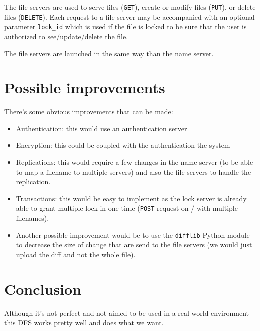 \documentclass[12pt,a4paper]{report}
\begin{document}
		The file servers are used to serve files (\texttt{GET}), create or modify files (\texttt{PUT}), or delete files (\texttt{DELETE}). Each request to a file server may be accompanied with an optional parameter \texttt{lock\_id} which is used if the file is locked to be sure that the user is authorized to see/update/delete the file.
		
		The file servers are launched in the same way than the name server.
		
	\section*{Possible improvements}
	
		There's some obvious improvements that can be made:
		\begin{itemize}
			\item Authentication: this would use an authentication server
			\item Encryption: this could be coupled with the authentication the system
			\item Replications: this would require a few changes in the name server (to be able to map a filename to multiple servers) and also the file servers to handle the replication.
			\item Transactions: this would be easy to implement as the lock server is already able to grant multiple lock in one time (\texttt{POST} request on / with multiple filenames).
			\item Another possible improvement would be to use the \texttt{difflib} Python module to decrease the size of change that are send to the file servers (we would just upload the diff and not the whole file).
		\end{itemize}			
	
	\section*{Conclusion}
	
		Although it's not perfect and not aimed to be used in a real-world environment this DFS works pretty well and does what we want.
\end{document}
